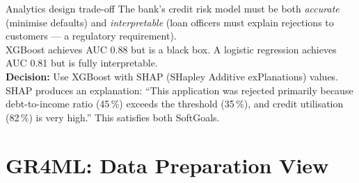 \documentclass[a4paper,11pt]{article}
\begin{document}
\begin{center}
\end{center}

\begin{worked}{Analytics design trade-off}
The bank's credit risk model must be both \emph{accurate} (minimise defaults) and \emph{interpretable} (loan officers must explain rejections to customers --- a regulatory requirement). \\[4pt]
XGBoost achieves AUC 0.88 but is a black box. A logistic regression achieves AUC 0.81 but is fully interpretable. \\[4pt]
\textbf{Decision:} Use XGBoost with SHAP (SHapley Additive exPlanations) values. SHAP produces an explanation: ``This application was rejected primarily because debt-to-income ratio (45\,\%) exceeds the threshold (35\,\%), and credit utilisation (82\,\%) is very high.'' This satisfies both SoftGoals.
\end{worked}

\section{GR4ML: Data Preparation View}
\end{document}
